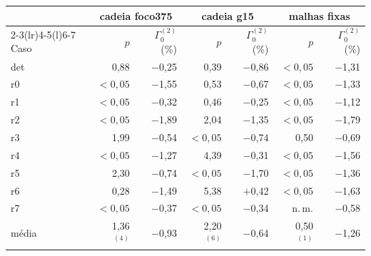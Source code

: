 \begin{tabular}{@{}l r r r r r r@{}}
\toprule
 & \multicolumn{2}{c}{cadeia foco375} & \multicolumn{2}{c}{cadeia g15} & \multicolumn{2}{c}{malhas fixas} \\
\cmidrule(lr){2-3}\cmidrule(lr){4-5}\cmidrule(l){6-7}
Caso & $p$ & $\Gamma_0^{(2)}$ (\%) & $p$ & $\Gamma_0^{(2)}$ (\%) & $p$ & $\Gamma_0^{(2)}$ (\%) \\
\midrule
det & 0{,}88 & $-$0{,}25 & 0{,}39 & $-$0{,}86 & $<0{,}05$ & $-$1{,}31 \\
r0 & $<0{,}05$ & $-$1{,}55 & 0{,}53 & $-$0{,}67 & $<0{,}05$ & $-$1{,}33 \\
r1 & $<0{,}05$ & $-$0{,}32 & 0{,}46 & $-$0{,}25 & $<0{,}05$ & $-$1{,}12 \\
r2 & $<0{,}05$ & $-$1{,}89 & 2{,}04 & $-$1{,}35 & $<0{,}05$ & $-$1{,}79 \\
r3 & 1{,}99 & $-$0{,}54 & $<0{,}05$ & $-$0{,}74 & 0{,}50 & $-$0{,}69 \\
r4 & $<0{,}05$ & $-$1{,}27 & 4{,}39 & $-$0{,}31 & $<0{,}05$ & $-$1{,}56 \\
r5 & 2{,}30 & $-$0{,}74 & $<0{,}05$ & $-$1{,}70 & $<0{,}05$ & $-$1{,}36 \\
r6 & 0{,}28 & $-$1{,}49 & 5{,}38 & $+$0{,}42 & $<0{,}05$ & $-$1{,}63 \\
r7 & $<0{,}05$ & $-$0{,}37 & $<0{,}05$ & $-$0{,}34 & n.\,m. & $-$0{,}58 \\
\midrule
média & 1{,}36$^{\,(4)}$ & $-$0{,}93 & 2{,}20$^{\,(6)}$ & $-$0{,}64 & 0{,}50$^{\,(1)}$ & $-$1{,}26 \\
\bottomrule
\end{tabular}
